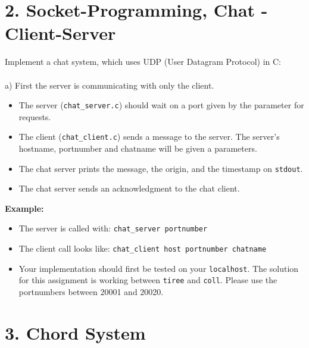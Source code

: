 \documentclass{article}
\begin{document}
\section*{2. Socket-Programming, Chat - Client-Server}

Implement a chat system, which uses UDP (User Datagram Protocol) in C:\\
\\
a) First the server is communicating with only the client.
\begin{itemize}
  \item The server (\texttt{chat\_server.c}) should wait on a port given by the parameter for requests.\\
  \item The client (\texttt{chat\_client.c}) sends a message to the server. The server's hostname, 
    portnumber and chatname will be given a parameters.\\
  \item The chat server prints the message, the origin, and the timestamp on \texttt{stdout}.\\
  \item The chat server sends an acknowledgment to the chat client.
\end{itemize}
\textbf{Example:}
\begin{itemize}
  \item The server is called with: \texttt{chat\_server portnumber}\\
  \item The client call looks like: \texttt{chat\_client host portnumber chatname}\\
  \item Your implementation should first be tested on your \texttt{localhost}. The solution for this
    assignment is working between \texttt{tiree} and \texttt{coll}. Please use the portnumbers between
    20001 and 20020.
\end{itemize}

\section*{3. Chord System}
\end{document}
